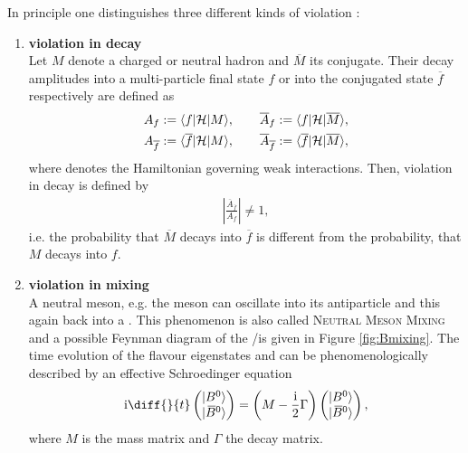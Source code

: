 In principle one distinguishes three different kinds of \CP violation \cite{PDG, Nierste}:
\begin{enumerate}
    \item \textbf{\CP violation in decay} \\
          Let $M$ denote a charged or neutral hadron and $\overline{M}$ its \CP conjugate.
          Their decay amplitudes into a multi-particle final state $f$ or into the \CP conjugated state $\overline{f}$ respectively are defined as
          \begin{align}
              A_f := \langle f|\mathcal{H}|M\rangle, \qquad \overline{A}_f := \langle f|\mathcal{H}|\overline{M}\rangle, \nonumber \\
              A_{\overline{f}} := \langle \overline{f}|\mathcal{H}|M\rangle, \qquad \overline{A}_{\overline{f}} := \langle \overline{f}|\mathcal{H}|\overline{M}\rangle,
          \end{align}
          where \Ham denotes the Hamiltonian governing weak interactions.
          Then, \CP violation in decay is defined by
          \begin{align}
            \left|\frac{\overline{A}_{\overline{f}}}{A_f}\right| \neq 1,
          \end{align}
          i.e. the probability that $\overline{M}$ decays into $\overline{f}$ is different from the probability, that $M$ decays into $f$.
    \item \textbf{\CP violation in mixing} \\
          A neutral meson, e.g. the \Bz meson can oscillate into its antiparticle \Bzb and this \Bzb again back into a \Bz.
          This phenomenon is also called \textsc{Neutral Meson Mixing} and a possible Feynman diagram of the \Bz/\Bzb is given in Figure \ref{fig:Bmixing}. 
          The time evolution of the flavour eigenstates \ket{\Bd} and \ket{\Bdb} can be phenomenologically described by an effective Schroedinger equation
          \begin{align}
              \im \diff{}{t}\begin{pmatrix} \ket{\text{\Bd}\vphantom{\text{\Bdb}}} \\ \ket{\text{\Bdb}} \end{pmatrix} = \left(M - \frac{\im}{2} \Gamma\right) \begin{pmatrix} \ket{\text{\Bd}\vphantom{\text{\Bdb}}} \\ \ket{\text{\Bdb}} \end{pmatrix},
          \end{align}
          where $M$ is the mass matrix and $\Gamma$ the decay matrix.

\end{enumerate}
